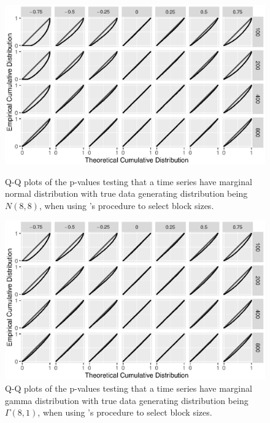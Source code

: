 \documentclass[12pt]{article}
\begin{document}
\begin{figure}[tbp]
  \includegraphics[width = .9\textwidth]{figures/alt_normal}
  \centering
  \vspace{-10pt}
  \caption{Q-Q plots of the p-values testing that a time series
    have marginal normal distribution with true data generating distribution
    being $N(8,8)$, when using \citet{politis2004automatic}'s procedure
    to select block sizes.}
  \label{fig:alt_qq_n}
    \hspace{3cm}
  \includegraphics[width = .9\textwidth]{figures/alt_gamma}
  \vspace{-5pt}
  \caption{Q-Q plots of the p-values testing that a time series
    have marginal gamma distribution with true data generating distribution
    being $\Gamma(8,1)$, when using \citet{politis2004automatic}'s procedure
    to select block sizes.}
  \label{fig:alt_qq_g}
\end{figure}
\end{document}
